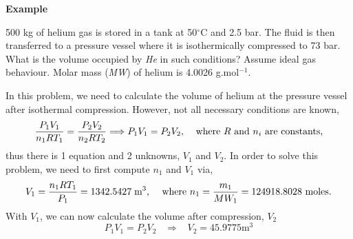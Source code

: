 \medskip
   \begin{MyExample}{\begin{center}{\bf Example}\end{center}}
     \begin{example}\label{Chapter:Intro_Property_of_Gases:Example2}
       500 kg of helium gas is stored in a tank at 50$^{\circ}$C and 2.5 bar. The fluid is then transferred to a pressure vessel where it is isothermically compressed to 73 bar.  What is the volume occupied by {\it He} in such conditions? Assume ideal gas behaviour. Molar mass ({\it MW}) of helium is 4.0026 g.mol$^{-1}$.
     \end{example}

        In this problem, we need to calculate the volume of helium at the pressure vessel after isothermal compression. However, not all necessary conditions are known, \ie
       \begin{displaymath}
         \displaystyle\frac{P_{1}V_{1}}{n_{1} R T_{1}} = \displaystyle\frac{P_{2}V_{2}}{n_{2} R T_{2}} \Longrightarrow P_{1}V_{1} = P_{2}V_{2},\;\;\;\;\text{where }R\text{ and } n_{i}\text{ are constants},
       \end{displaymath}
           thus there is 1 equation and 2 unknowns, $V_{1}$ and $V_{2}$. In order to solve this problem, we need to first compute $n_{1}$ and $V_{1}$ via, 
           \begin{displaymath}
              V_{1} = \displaystyle\frac{n_{1}R T_{1}}{P_{1}} = 1342.5427\;\text{m}^{3},\;\;\;\text{ where } n_{1} = \displaystyle\frac{m_{1}}{MW_{1}} =  124918.8028\text{ moles}.
           \end{displaymath}
           With $V_{1}$, we can now calculate the volume after compression, $V_{2}$
           \begin{displaymath}
              P_{1}V_{1} = P_{2}V_{2} \;\;\; \Longrightarrow\;\;\; V_{2} = 45.9775 \text{m}^{3}
           \end{displaymath}
   \end{MyExample}
   
